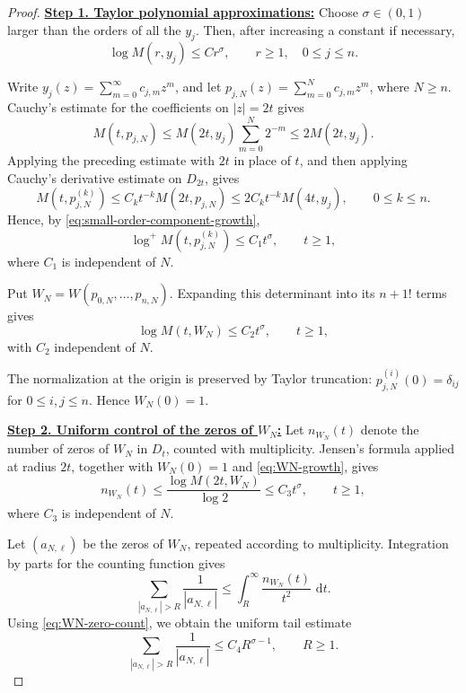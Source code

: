 \documentclass[12pt,letterpaper,reqno]{amsart}
\theoremstyle{definition}
\numberwithin{equation}{section}
\newcommand{\dd}{\,\mathrm d}
\begin{document}
\begin{proof}

\medskip\noindent
\textbf{\underline{Step 1. Taylor polynomial approximations:}}
Choose \(\sigma\in(0,1)\) larger than the orders of all the
\(y_j\). Then, after increasing a constant if necessary,
\begin{equation}\label{eq:small-order-component-growth}
 \log M(r,y_j)\leq C r^\sigma,
 \qquad
 r\geq1,\quad 0\leq j\leq n.
\end{equation}

Write \(y_j(z)=\sum_{m=0}^\infty c_{j,m}z^m\), and let
\(p_{j,N}(z)=\sum_{m=0}^Nc_{j,m}z^m\), where \(N\geq n\).
Cauchy's estimate for the coefficients on \(|z|=2t\) gives
\[
 M(t,p_{j,N})
 \leq
 M(2t,y_j)\sum_{m=0}^N2^{-m}
 \leq
 2M(2t,y_j).
\]
Applying the preceding estimate with \(2t\) in place of \(t\), and
then applying Cauchy's derivative estimate on \(D_{2t}\), gives
\[
 M(t,p_{j,N}^{(k)})
 \leq
 C_k t^{-k}M(2t,p_{j,N})
 \leq
 2C_k t^{-k}M(4t,y_j),
 \qquad 0\leq k\leq n.
\]
Hence, by \eqref{eq:small-order-component-growth},
\[
 \log^+M(t,p_{j,N}^{(k)})
 \leq C_1t^\sigma,
 \qquad t\geq1,
\]
where \(C_1\) is independent of \(N\).

Put
\(W_N=W(p_{0,N},\ldots,p_{n,N})\).
Expanding this determinant into its \({n+1}!\) terms gives
\begin{equation}\label{eq:WN-growth}
 \log M(t,W_N)\leq C_2t^\sigma,
 \qquad
 t\geq1,
\end{equation}
with \(C_2\) independent of \(N\).

The normalization at the origin is preserved by Taylor truncation:
\(p_{j,N}^{(i)}(0)=\delta_{ij}\) for
\(0\leq i,j\leq n\). Hence \(W_N(0)=1\).


\medskip\noindent
\textbf{\underline{Step 2. Uniform control of the zeros of \(W_N\):}}
Let \(n_{W_N}(t)\) denote the number of zeros of \(W_N\) in \(D_t\),
counted with multiplicity. Jensen's formula applied at radius \(2t\),
together with \(W_N(0)=1\) and \eqref{eq:WN-growth}, gives
\begin{equation}\label{eq:WN-zero-count}
 n_{W_N}(t)
 \leq
 \frac{\log M(2t,W_N)}{\log2}
 \leq
 C_3t^\sigma,
 \qquad
 t\geq1,
\end{equation}
where \(C_3\) is independent of \(N\).

Let \((a_{N,\ell})\) be the zeros of \(W_N\), repeated according to
multiplicity. Integration by parts for the counting function gives
\[
 \sum_{|a_{N,\ell}|>R}\frac1{|a_{N,\ell}|}
 \leq
 \int_R^\infty
 \frac{n_{W_N}(t)}{t^2}\,\dd t.
\]
Using \eqref{eq:WN-zero-count}, we obtain the uniform tail estimate
\begin{equation}\label{eq:reciprocal-tail}
 \sum_{|a_{N,\ell}|>R}\frac1{|a_{N,\ell}|}
 \leq
 C_4R^{\sigma-1},
 \qquad
 R\geq1.
\end{equation}



\end{proof}
\end{document}
